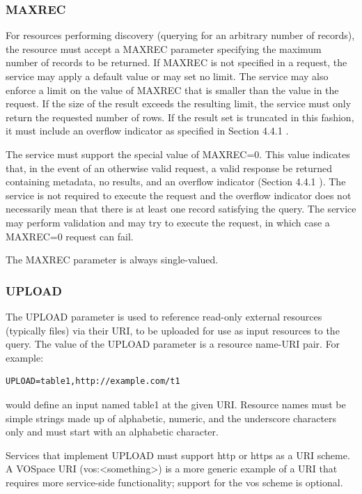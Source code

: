 \documentclass[11pt,letter]{ivoa}
\begin{document}
\subsubsection{MAXREC}
\label{sec:MAXREC}
For resources performing discovery (querying for an arbitrary number of 
records), the resource must accept a MAXREC parameter specifying the maximum 
number of records to be returned. If MAXREC is not specified in a request, the 
service may apply a default value or may set no limit. The service may also 
enforce a limit on the value of MAXREC that is smaller than the value in the 
request. If the size of the result exceeds the resulting limit, the service must 
only return the requested number of rows. If the result set is truncated in this 
fashion, it must include an overflow indicator as specified in Section 4.4.1 .

The service must support the special value of MAXREC=0. This value indicates 
that, in the event of an otherwise valid request, a valid response be returned 
containing metadata, no results, and an overflow indicator (Section 4.4.1 ). The 
service is not required to execute the request and the overflow indicator does 
not necessarily mean that there is at least one record satisfying the query. The 
service may perform validation and may try to execute the request, in which case 
a MAXREC=0 request can fail.

The MAXREC parameter is always single-valued.

\subsubsection{UPLOAD}
\label{sec:UPLOAD}
The UPLOAD parameter is used to reference read-only external resources 
(typically files) via their URI, to be uploaded for use as input resources to 
the query. The value of the UPLOAD parameter is a resource name-URI pair. For 
example:

\begin{verbatim}
UPLOAD=table1,http://example.com/t1
\end{verbatim}

would define an input named table1 at the given URI. Resource names must be 
simple strings made up of alphabetic, numeric, and the underscore characters 
only and must start with an alphabetic character.

Services that implement UPLOAD must support http or https as a URI scheme. 
A VOSpace URI (vos:<something>)  is a 
more generic example of a URI that requires more service-side functionality; 
support for the vos scheme is optional.
\end{document}
